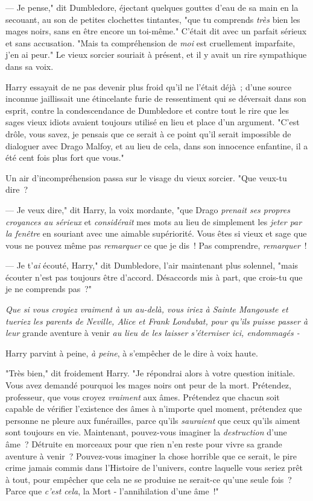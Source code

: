 --- Je pense," dit Dumbledore, éjectant quelques gouttes d'eau de sa main en la secouant, au son de petites clochettes tintantes, "que tu comprends \emph{très} bien les mages noirs, sans en être encore un toi-même." C'était dit avec un parfait sérieux et sans accusation. "Mais ta compréhension de \emph{moi} est cruellement imparfaite, j'en ai peur." Le vieux sorcier souriait à présent, et il y avait un rire sympathique dans sa voix.

Harry essayait de ne pas devenir plus froid qu'il ne l'était déjà~; d'une source inconnue jaillissait une étincelante furie de ressentiment qui se déversait dans son esprit, contre la condescendance de Dumbledore et contre tout le rire que les sages vieux idiots avaient toujours utilisé en lieu et place d'un argument. "C'est drôle, vous savez, je pensais que ce serait à ce point qu'il serait impossible de dialoguer avec Drago Malfoy, et au lieu de cela, dans son innocence enfantine, il a été cent fois plus fort que vous."

Un air d'incompréhension passa sur le visage du vieux sorcier. "Que veux-tu dire~?

--- Je veux dire," dit Harry, la voix mordante, "que Drago \emph{prenait ses propres croyances au sérieux} et \emph{considérait} mes mots au lieu de simplement les \emph{jeter par la fenêtre} en souriant avec une aimable supériorité. Vous êtes si vieux et sage que vous ne pouvez même pas \emph{remarquer} ce que je dis~! Pas comprendre, \emph{remarquer}~!

--- Je t'\emph{ai} écouté, Harry," dit Dumbledore, l'air maintenant plus solennel, "mais écouter n'est pas toujours être d'accord. Désaccords mis à part, que crois-tu que je ne comprends pas~?"

\emph{Que si vous croyiez vraiment à un au-delà, vous iriez à Sainte Mangouste et tueriez les parents de Neville, Alice et Frank Londubat, pour qu'ils puisse passer à leur} grande aventure à venir \emph{au lieu de les laisser s'éterniser ici, endommagés -}

Harry parvint à peine, \emph{à peine}, à s'empêcher de le dire à voix haute.

"Très bien," dit froidement Harry. "Je répondrai alors à votre question initiale. Vous avez demandé pourquoi les mages noirs ont peur de la mort. Prétendez, professeur, que vous croyez \emph{vraiment} aux âmes. Prétendez que chacun soit capable de vérifier l'existence des âmes à n'importe quel moment, prétendez que personne ne pleure aux funérailles, parce qu'ils \emph{sauraient} que ceux qu'ils aiment sont toujours en vie. Maintenant, pouvez-vous imaginer la \emph{destruction} d'une âme~? Détruite en morceaux pour que rien n'en reste pour vivre sa grande aventure à venir~? Pouvez-vous imaginer la chose horrible que ce serait, le pire crime jamais commis dans l'Histoire de l'univers, contre laquelle vous seriez prêt à tout, pour empêcher que cela ne se produise ne serait-ce qu'une seule fois~? Parce que \emph{c'est cela}, la Mort - l'annihilation d'une âme~!"


